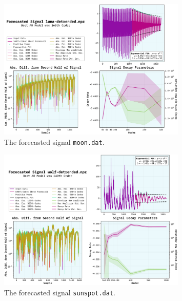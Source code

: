 \documentclass[10pt, titlepage, a4paper]{article}
\begin{document}
\begin{figure}[H]
    \centering
    \includegraphics[width=0.8\textwidth]{../LinForecast/Images/forecast-luna-detrended.npz.pdf}
    \caption{The forecasted signal \texttt{moon.dat}.}
    \label{fig:forecast-5}
\end{figure}

\begin{figure}[H]
    \centering
    \includegraphics[width=0.8\textwidth]{../LinForecast/Images/forecast-wolf-detrended.npz.pdf}
    \caption{The forecasted signal \texttt{sunspot.dat}.}
    \label{fig:forecast-6}
\end{figure}
\end{document}

